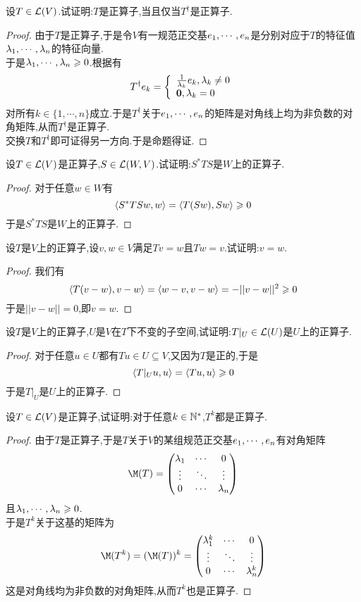 \documentclass{ctexart}
\begin{document}
\begin{problem}[8.]
    设$T\in\mathcal{L}(V)$.试证明:$T$是正算子,当且仅当$T^\dagger$是正算子.
\end{problem}
\begin{proof}
    由于$T$是正算子,于是令$V$有一规范正交基${e}_1,\cdots,{e}_{n}$是分别对应于$T$的特征值${\lambda}_1,\cdots,{\lambda}_{n}$的特征向量.\\
    于是${\lambda}_1,\cdots,{\lambda}_{n}\geqslant0$.根据有
    \[T^\dagger e_k=\left\{\begin{array}{l}
        \frac{1}{\lambda_k}e_k,\lambda_k\neq0\\\mathbf0,\lambda_k=0
    \end{array}\right.\]
    对所有$k\in\{1,\cdots,n\}$成立.于是$T^\dagger$关于${e}_1,\cdots,{e}_{n}$的矩阵是对角线上均为非负数的对角矩阵,从而$T^\dagger$是正算子.\\
    交换$T$和$T^\dagger$即可证得另一方向.于是命题得证.
\end{proof}
\begin{problem}[9.]
    设$T\in\mathcal{L}(V)$是正算子,$S\in\mathcal{L}(W,V)$.试证明:$S^*TS$是$W$上的正算子.
\end{problem}
\begin{proof}
    对于任意$w\in W$有
    \[\left\langle{S^*TSw},{w}\right\rangle=\left\langle{T(Sw)},{Sw}\right\rangle\geqslant0\]
    于是$S^*TS$是$W$上的正算子.
\end{proof}
\begin{problem}[10.]
    设$T$是$V$上的正算子,设$v,w\in V$满足$Tv=w$且$Tw=v$.试证明:$v=w$.
\end{problem}
\begin{proof}
    我们有
    \[\left\langle{T(v-w)},{v-w}\right\rangle=\left\langle{w-v},{v-w}\right\rangle=-||v-w||^2\geqslant0\]
    于是$||v-w||=0$,即$v=w$.
\end{proof}
\begin{problem}[11.]
    设$T$是$V$上的正算子,$U$是$V$在$T$下不变的子空间,试证明:$T|_U\in\mathcal{L}(U)$是$U$上的正算子.
\end{problem}
\begin{proof}
    对于任意$u\in U$都有$Tu\in U\subseteq V$,又因为$T$是正的,于是
    \[\left\langle{T|_Uu},{u}\right\rangle=\left\langle{Tu},{u}\right\rangle\geqslant0\]
    于是$T|_U$是$U$上的正算子.
\end{proof}
\begin{problem}[12.]
    设$T\in\mathcal{L}(V)$是正算子,试证明:对于任意$k\in\mathbb{N}^*$,$T^k$都是正算子.
\end{problem}
\begin{proof}
    由于$T$是正算子,于是$T$关于$V$的某组规范正交基${e}_1,\cdots,{e}_{n}$有对角矩阵
    \[\M(T)=\begin{pmatrix}
        \lambda_1&\cdots&0\\
        \vdots&\ddots&\vdots\\
        0&\cdots&\lambda_n
    \end{pmatrix}\]
    且${\lambda}_1,\cdots,{\lambda}_{n}\geqslant0$.\\
    于是$T^k$关于这基的矩阵为
    \[\M(T^k)=(\M(T))^k=\begin{pmatrix}
        \lambda_1^k&\cdots&0\\
        \vdots&\ddots&\vdots\\
        0&\cdots&\lambda_n^k
    \end{pmatrix}\]
    这是对角线均为非负数的对角矩阵,从而$T^k$也是正算子.
\end{proof}
\end{document}
